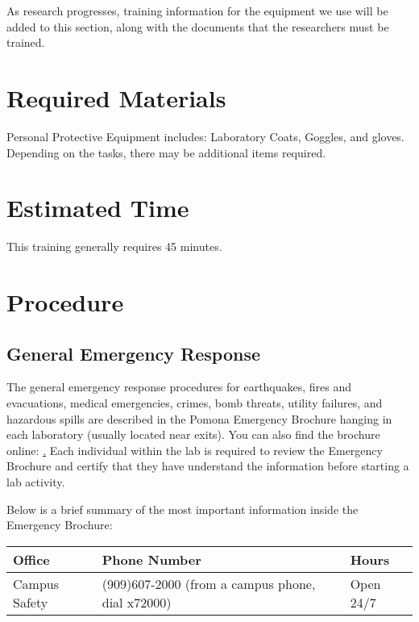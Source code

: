 \documentclass[12pt]{../SOP4_alpha}\usepackage[]{graphicx}\usepackage[]{color}
\begin{document}
\NP As research progresses, training information for the equipment we use will be added to this section, along with the documents that the researchers must be trained.

\section{Required Materials}

\NP Personal Protective Equipment includes: Laboratory Coats, Goggles, and gloves. Depending on the tasks, there may be additional items required.

\section{Estimated Time}

\NP This training generally requires 45 minutes.

\section{Procedure}

\subsection*{General Emergency Response}

\NP The general emergency response procedures for earthquakes, fires and evacuations, medical emergencies, crimes, bomb threats, utility failures, and hazardous spills are described in the Pomona Emergency Brochure hanging in each laboratory (usually located near exits). You can also find the brochure online: \href{http://www.pomona.edu/sites/default/files/emergency-instructions.pdf}. Each individual within the lab is required to review the Emergency Brochure and certify that they have understand the information before starting a lab activity.

\NP Below is a brief summary of the most important information inside the Emergency Brochure: 

\begin{table}
\begin{tabular}{lll} \hline
Office            & Phone Number & Hours \\ \hline\hline
Campus Safety     & (909)607-2000 (from a campus phone, dial x72000) & Open 24/7 \\ \hline
\end{tabular}
\end{table}
\end{document}
